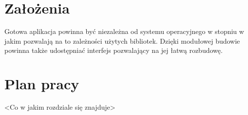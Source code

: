 \section{Założenia}
Gotowa aplikacja powinna być niezależna od systemu operacyjnego w stopniu w jakim pozwalają na to zależności użytych bibliotek. Dzięki modułowej budowie powinna także udostępniać interfejs pozwalający na jej łatwą rozbudowę.

\section{Plan pracy}
<Co w jakim rozdziale się znajduje>

\clearpage
